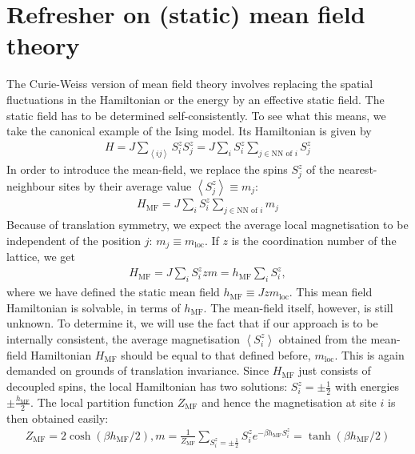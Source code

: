 \documentclass{article}
\begin{document}
\section{Refresher on (static) mean field theory}
The Curie-Weiss version of mean field theory involves replacing the spatial fluctuations in the Hamiltonian or the energy by an effective static field. The static field has to be determined self-consistently. To see what this means, we take the canonical example of the Ising model. Its Hamiltonian is given by
\begin{equation}\begin{aligned}
	H = J\sum_{\left<ij \right>} S_i^z S_j^z = J\sum_i S_i^z \sum_{j \in \text{NN of }i}S_j^z
\end{aligned}\end{equation}
In order to introduce the mean-field, we replace the spins \(S_j^z\) of the nearest-neighbour sites by their average value \(\left<S_j^z\right> \equiv m_j\):
\begin{equation}\begin{aligned}
	H_\text{MF} = J\sum_i S_i^z \sum_{j \in \text{NN of }i}m_j
\end{aligned}\end{equation}
Because of translation symmetry, we expect the average local magnetisation to be independent of the position \(j\): \(m_j \equiv m_\text{loc}\). If \(z\) is the coordination number of the lattice, we get
\begin{equation}\begin{aligned}
	H_\text{MF} = J\sum_i S_i^z z m = h_\text{MF} \sum_i S_i^z,
\end{aligned}\end{equation}
where we have defined the static mean field \(h_\text{MF} \equiv Jzm_\text{loc}\). This mean field Hamiltonian is solvable, in terms of \(h_\text{MF}\). The mean-field itself, however, is still unknown. To determine it, we will use the fact that if our approach is to be internally consistent, the average magnetisation \(\left<S_i^z \right>\) obtained from the mean-field Hamiltonian \(H_\text{MF}\) should be equal to that defined before, \(m_\text{loc}\). This is again demanded on grounds of translation invariance. Since \(H_\text{MF}\) just consists of decoupled spins, the local Hamiltonian has two solutions: \(S_i^z = \pm \frac{1}{2}\) with energies \(\pm \frac{h_\text{MF}}{2}\). The local partition function \(Z_\text{MF}\) and hence the magnetisation at site \(i\) is then obtained easily:
\begin{equation}\begin{aligned}
	Z_\text{MF} = 2\cosh \left(\beta h_\text{MF}/2\right), m = \frac{1}{Z_\text{MF}}\sum_{S_i^z = \pm \frac{1}{2}} S_i^z e^{-\beta h_\text{MF}S_i^z} = \tanh \left(\beta h_\text{MF}/2\right)
\end{aligned}\end{equation}
\end{document}
